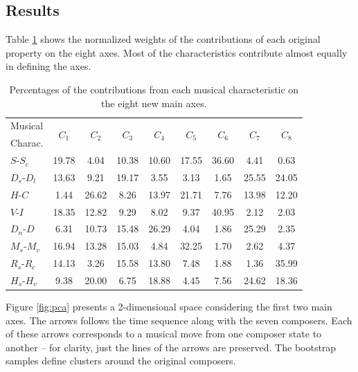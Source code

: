 \documentclass[
 aip,
 jmp,
 amsmath,amssymb,
 reprint,
]{revtex4-1}
\begin{document}
\subsection{Results}

Table \ref{tab:Deviates} shows the normalized weights
of the contributions of each original property on the eight
axes. Most of the characteristics contribute almost equally
in defining the axes. 

\begin{table}[ht]
\caption{\label{tab:Deviates}Percentages of
the contributions from each musical characteristic on the eight
new main axes.}

\begin{tabular}{|l||c|c|c|c|c|c|c|c|}
\hline
Musical         & \multirow{2}{*}{$C_1$} & \multirow{2}{*}{$C_2$} & \multirow{2}{*}{$C_3$} & \multirow{2}{*}{$C_4$} & \multirow{2}{*}{$C_5$} & \multirow{2}{*}{$C_6$} & \multirow{2}{*}{$C_7$} & \multirow{2}{*}{$C_8$}\\
Charac. & & & & & & & & \\
\hline
 $S$-$S_c$              &  19.78  &   4.04  & 10.38 & 10.60 &  17.55  &  36.60  &  4.41 &  0.63 \\
 $D_s$-$D_l$            &  13.63  &   9.21  & 19.17 &  3.55 &   3.13  &   1.65  & 25.55 & 24.05 \\
 $H$-$C$                &   1.44  &  26.62  & 8.26 & 13.97 &  21.71  &   7.76  & 13.98 & 12.20 \\
 $V$-$I$                &  18.35  &  12.82  & 9.29 &  8.02 &   9.37  &  40.95  &  2.12 &  2.03 \\
 $D_n$-$D$              &   6.31  &  10.73  & 15.48 & 26.29 &  4.04  &   1.86  & 25.29 &  2.35 \\
 $M_s$-$M_v$            &  16.94  &  13.28  & 15.03 &  4.84 &  32.25  &  1.70  &  2.62 &  4.37 \\
 $R_s$-$R_c$            &  14.13  &   3.26  & 15.58 & 13.80 &   7.48  &  1.88  &  1.36 & 35.99 \\
 $H_s$-$H_v$            &   9.38  &  20.00  &  6.75 & 18.88 &   4.45  &  7.56  & 24.62 & 18.36 \\
\hline
\end{tabular}
\end{table}

Figure \ref{fig:pca} presents a 2-dimensional space considering the
first two main axes. The arrows follows the time sequence along with the seven
composers. Each of these arrows corresponds to a musical move from one
composer state to another -- for clarity, just the lines of the arrows
are preserved. The bootstrap
samples define clusters around the original
composers.
\end{document}
